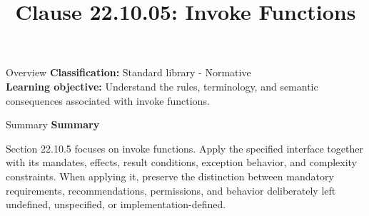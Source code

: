 \documentclass[10pt,letterpaper]{article}
\title{Clause 22.10.05: Invoke Functions}
\author{}
\date{}
\begin{document}
\maketitle
\begin{CornellOverviewBox}{Overview}
\textbf{Classification:} Standard library - Normative\\[2pt]
\textbf{Learning objective:} Understand the rules, terminology, and semantic consequences associated with invoke functions.
\end{CornellOverviewBox}\begin{CornellSummaryBox}{Summary}
{\sffamily\bfseries\color{Accent} Summary}\par\vspace{3pt}Section 22.10.5 focuses on invoke functions. Apply the specified interface together with its mandates, effects, result conditions, exception behavior, and complexity constraints. When applying it, preserve the distinction between mandatory requirements, recommendations, permissions, and behavior deliberately left undefined, unspecified, or implementation-defined.
\end{CornellSummaryBox}
\end{document}
